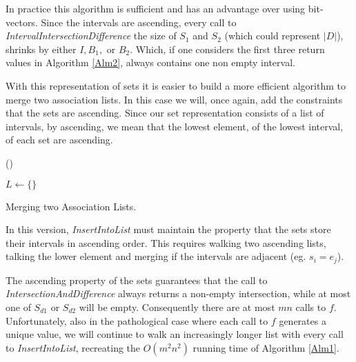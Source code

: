\documentclass{article}
\begin{document}
In practice this algorithm is sufficient and has an advantage
over using bit-vectors.
Since the intervals are ascending,
every call to
\emph{IntervalIntersectionDifference}
the size of $S_{1}$ and $S_{2}$ (which could represent $|D|$),
shrinks by either $I,B_{1},$ or $B_{2}$.
Which, if one considers the first three return
values in Algorithm \ref{Alm2},
always contains one non empty interval.

With this representation of sets it is easier to build a more efficient
algorithm to merge two association lists.
In this case we will,
once again,
add the constraints that the sets are ascending.
Since our set representation consists of a list of intervals,
by ascending,
we mean that the lowest element, of the lowest interval,
of each set
are ascending.

\begin{algorithm}[H]
  \newcommand{\forcond}{$i=0$ \KwTo $n$}
  \DontPrintSemicolon
  \Fn(){}{
    $L \leftarrow \{\} $\;

  }

\caption{Merging two Association Lists.\label{Alm4}}
\end{algorithm}

In this version, \emph{InsertIntoList} must maintain the property that the
sets store their intervals in ascending order.
This requires walking two ascending lists,
talking the lower element and merging if the intervals are adjacent
(eg. $s_{i} = e_{j}$).

The ascending property of the sets guarantees that the call to
\emph{IntersectionAndDifference} always returns a non-empty intersection,
while at most one of $S_{d1}$ or $S_{d2}$ will be empty.
Consequently there are at most $mn$ calls to $f$.
Unfortunately,
also in the pathological case where each call to $f$ generates a unique value,
we will continue to walk an increasingly longer list with every call to
\emph{InsertIntoList},
recreating the $O(m^{2}n^{2})$ running time of Algorithm \ref{Alm1}.
\end{document}
